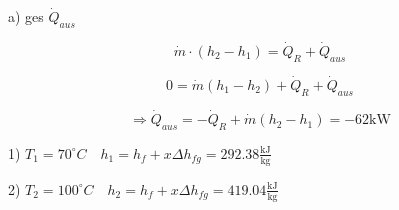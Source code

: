 a) ges $\dot{Q}_{aus}$

\[
\dot{m} \cdot (h_2 - h_1) = \dot{Q}_R + \dot{Q}_{aus}
\]

\[
0 = \dot{m} (h_1 - h_2) + \dot{Q}_R + \dot{Q}_{aus}
\]

\[
\Rightarrow \dot{Q}_{aus} = -\dot{Q}_R + \dot{m} (h_2 - h_1) = -62 \text{kW}
\]

1) $T_1 = 70^\circ C \quad h_1 = h_f + x \Delta h_{fg} = 292.38 \frac{\text{kJ}}{\text{kg}}$

2) $T_2 = 100^\circ C \quad h_2 = h_f + x \Delta h_{fg} = 419.04 \frac{\text{kJ}}{\text{kg}}$